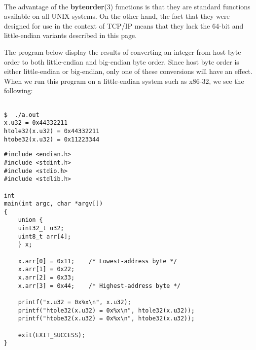 \documentclass[]{article}
\let\realtextbf=\textbf
\renewcommand{\textbf}[1]{\textcolor{boldcolor}{\realtextbf{#1}}}
\begin{document}
~

The advantage of the \textbf{byteorder}(3) functions is that they are
standard functions available on all UNIX systems. On the other hand, the
fact that they were designed for use in the context of TCP/IP means that
they lack the 64-bit and little-endian variants described in this page.


The program below display the results of converting an integer from host
byte order to both little-endian and big-endian byte order. Since host
byte order is either little-endian or big-endian, only one of these
conversions will have an effect. When we run this program on a
little-endian system such as x86-32, we see the following: \\

\begin{verbatim}

$  ./a.out
x.u32 = 0x44332211
htole32(x.u32) = 0x44332211
htobe32(x.u32) = 0x11223344
\end{verbatim}


\begin{verbatim}
#include <endian.h>
#include <stdint.h>
#include <stdio.h>
#include <stdlib.h>

int
main(int argc, char *argv[])
{
    union {
    uint32_t u32;
    uint8_t arr[4];
    } x;

    x.arr[0] = 0x11;    /* Lowest-address byte */
    x.arr[1] = 0x22;
    x.arr[2] = 0x33;
    x.arr[3] = 0x44;    /* Highest-address byte */

    printf("x.u32 = 0x%x\n", x.u32);
    printf("htole32(x.u32) = 0x%x\n", htole32(x.u32));
    printf("htobe32(x.u32) = 0x%x\n", htobe32(x.u32));

    exit(EXIT_SUCCESS);
}
\end{verbatim}

\end{document}
